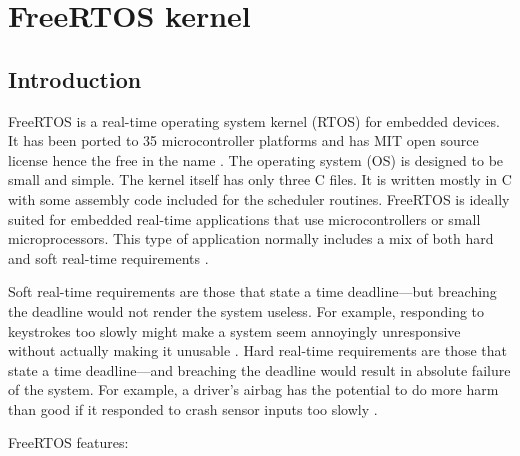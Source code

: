 \chapter{FreeRTOS kernel} %
\label{freertos_kernel}

\section{Introduction}

FreeRTOS is a real-time operating system kernel (RTOS) for embedded devices. It has been ported to 35 microcontroller platforms and has MIT open source license hence the free in the name  \citep{freertos_licence}. The operating system (OS) is designed to be small and simple. The kernel itself has only three C files. It is written mostly in C with some assembly code included for the scheduler routines. FreeRTOS is ideally suited for embedded real-time applications that use
microcontrollers or small microprocessors. This type of application normally includes a mix of
both hard and soft real-time requirements \citep{freertos_mastering}.

Soft real-time requirements are those that state a time deadline—but breaching the deadline
would not render the system useless. For example, responding to keystrokes too slowly might
make a system seem annoyingly unresponsive without actually making it unusable \citep{freertos_mastering}. Hard real-time requirements are those that state a time deadline—and breaching the deadline
would result in absolute failure of the system. For example, a driver’s airbag has the potential
to do more harm than good if it responded to crash sensor inputs too slowly \citep{freertos_mastering}.

\noindent FreeRTOS features:

